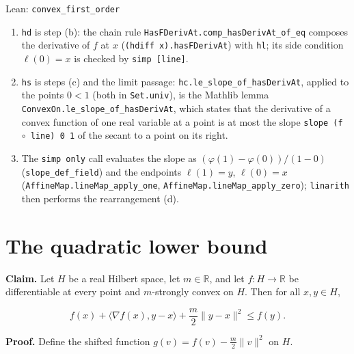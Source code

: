 \documentclass[11pt,a4paper]{article}
\begin{document}
\begin{leanbox}{Lean: \texttt{convex\_\allowbreak{}first\_\allowbreak{}order}}
\begin{enumerate}
\item \texttt{hd} is step (b): the chain rule \texttt{Has\allowbreak{}FDeriv\allowbreak{}At.\allowbreak{}comp\_\allowbreak{}has\allowbreak{}Deriv\allowbreak{}At\_\allowbreak{}of\_\allowbreak{}eq} composes the derivative of \(f\) at \(x\) (\texttt{(hdiff x).\allowbreak{}has\allowbreak{}FDeriv\allowbreak{}At}) with \texttt{hl}; its side condition \(\ell(0)=x\) is checked by \texttt{simp [line]}.

\item \texttt{hs} is steps (c) and the limit passage: \texttt{hc.\allowbreak{}le\_\allowbreak{}slope\_\allowbreak{}of\_\allowbreak{}has\allowbreak{}Deriv\allowbreak{}At}, applied to the points \(0<1\) (both in \texttt{Set.\allowbreak{}univ}), is the Mathlib lemma \texttt{Convex\allowbreak{}On.\allowbreak{}le\_\allowbreak{}slope\_\allowbreak{}of\_\allowbreak{}has\allowbreak{}Deriv\allowbreak{}At}, which states that the derivative of a convex function of one real variable at a point is at most the slope \texttt{slope (f \ensuremath{\circ} line) 0 1} of the secant to a point on its right.

\item The \texttt{simp only} call evaluates the slope as \((\varphi(1)-\varphi(0))/(1-0)\) (\texttt{slope\_\allowbreak{}def\_\allowbreak{}field}) and the endpoints \(\ell(1)=y\), \(\ell(0)=x\) (\texttt{Affine\allowbreak{}Map.\allowbreak{}line\allowbreak{}Map\_\allowbreak{}apply\_\allowbreak{}one}, \texttt{Affine\allowbreak{}Map.\allowbreak{}line\allowbreak{}Map\_\allowbreak{}apply\_\allowbreak{}zero}); \texttt{linarith} then performs the rearrangement (d).

\end{enumerate}
\end{leanbox}

\section{\texorpdfstring{The quadratic lower bound}{The quadratic lower bound}}


\textbf{Claim.} Let \(H\) be a real Hilbert space, let \(m\in\mathbb R\), and let \(f:H\to\mathbb R\) be differentiable at every point and \(m\)-strongly convex on \(H\). Then for all \(x,y\in H\),


\[f(x)+\langle\nabla f(x),y-x\rangle+\frac m2\|y-x\|^2\le f(y).\]


\textbf{Proof.} Define the shifted function \(g(v)=f(v)-\frac m2\|v\|^2\) on \(H\).
\end{document}
